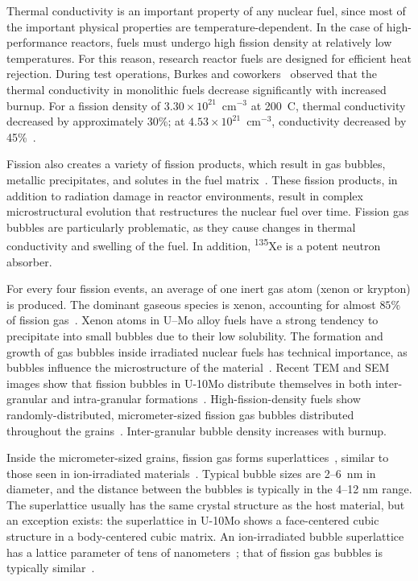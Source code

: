 Thermal conductivity is an important property of any nuclear fuel, since most of the important physical properties are temperature-dependent. In the case of high-performance reactors, fuels must undergo high fission density at relatively low temperatures. For this reason, research reactor fuels are designed for efficient heat rejection. During test operations, Burkes and coworkers~\cite{burkes2015thermal} observed that the thermal conductivity in monolithic fuels decrease significantly with increased burnup. For a fission density of $3.30\times10^{21}$~cm$^{-3}$ at 200~\textdegree C, thermal conductivity decreased by approximately 30\%; at $4.53\times10^{21}$~cm$^{-3}$, conductivity decreased by 45\%~\cite{burkes2015thermal}.

Fission also creates a variety of fission products, which result in gas bubbles, metallic precipitates, and solutes in the fuel matrix~\cite{rondinella2010high}. These fission products, in addition to radiation damage in reactor environments, result in complex microstructural evolution that restructures the nuclear fuel over time. Fission gas bubbles are particularly problematic, as they cause changes in thermal conductivity and swelling of the fuel. In addition, \textsuperscript{135}Xe is a potent neutron absorber.

For every four fission events, an average of one inert gas atom (xenon or krypton) is produced. The dominant gaseous species is xenon, accounting for almost $85\%$ of fission gas~\cite{blades1956ratio,petruska1955absolute}. Xenon atoms in U--Mo alloy fuels have a strong tendency to precipitate into small bubbles due to their low solubility. The formation and growth of gas bubbles inside irradiated nuclear fuels has technical importance, as bubbles influence the microstructure of the material~\cite{kim2011fission}. Recent TEM and SEM images show that fission bubbles in U-10Mo distribute themselves in both inter-granular and intra-granular formations~\cite{miller2015transmission,miller2012advantages, gan2010transmission, gan2012tem}. High-fission-density fuels show randomly-distributed, micrometer-sized fission gas bubbles distributed throughout the grains~\cite{gan2012tem}. Inter-granular bubble density increases with burnup. 

Inside the micrometer-sized grains, fission gas forms superlattices~\cite{gan2012tem,miller2015transmission,miller2012advantages},
similar to those seen in ion-irradiated materials~\cite{johnson1980gas, johnson1980hydrogen, evans1983void, mazey1986bubble, evans1986solid, johnson1991image, johnson1995gas, lawson1998temperature, ghoniem2001theory,johnson2006helium}. Typical bubble sizes are 2--6~nm in diameter, and the distance between the bubbles is typically in the 4--12 nm range. The superlattice usually has the same crystal structure as the host material, but an exception exists: the superlattice in U-10Mo shows a face-centered cubic structure in a body-centered cubic matrix. An ion-irradiated bubble superlattice has a lattice parameter of tens of nanometers~\cite{miller2015transmission}; that of fission gas bubbles is
typically similar~\cite{Gan2015}.


